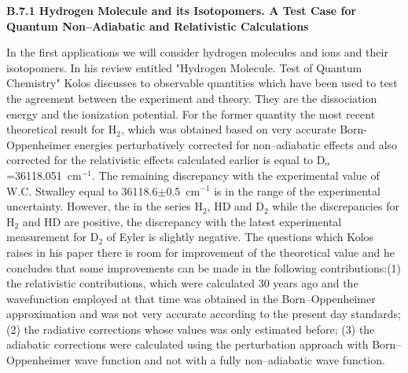 \vspace{2mm}
\noindent
{\bf B.7.1 Hydrogen Molecule and its Isotopomers. A Test
Case for Quantum Non--Adiabatic and Relativistic Calculations}



In the first applications 
we will consider
hydrogen molecules and ions and their isotopomers.
In his review entitled "Hydrogen Molecule. Test of Quantum Chemistry"
\cite{kk} Kolos discusses to observable quantities which have
been used to test the agreement between the experiment and theory.
They are the dissociation energy and the ionization potential.
For the former quantity the most recent theoretical result
for H$_2$, which was obtained based on very accurate Born-Oppenheimer
energies perturbatively corrected for non--adiabatic effects
and also corrected for the relativistic effects calculated
earlier is equal to D$_{\rm o}$=36118.051~cm$^{-1}$. The remaining
discrepancy with the experimental value of W.C. Stwalley\cite{k29}
equal to 36118.6$\pm$0.5~cm$^{-1}$ is in the range of the
experimental uncertainty.
However, the in the series H$_2$, HD and D$_2$ while the
discrepancies for H$_2$ and HD are positive, the discrepancy
with the latest experimental measurement for D$_2$ of
Eyler\cite{k42,k42p}
is slightly negative.
The questions which Kolos raises
in his paper there is room for improvement of the theoretical
value and he concludes that some improvements can be made
in the following contributions:(1) the relativistic contributions,
which were calculated 30 years ago and the wavefunction
employed at that time was obtained in the Born--Oppenheimer
approximation and was not very accurate according to the present
day standards; (2) the radiative corrections whose values
was only estimated before; (3) the adiabatic corrections
were calculated using the perturbation approach with Born--Oppenheimer
wave function and not with a fully non--adiabatic wave function.

